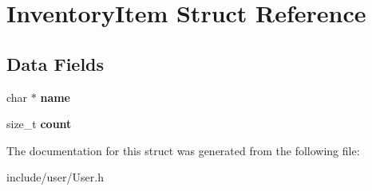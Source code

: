 \hypertarget{struct_inventory_item}{}\section{Inventory\+Item Struct Reference}
\label{struct_inventory_item}
\subsection*{Data Fields}
\begin{DoxyCompactItemize}
\item 
\hypertarget{struct_inventory_item_a5ac083a645d964373f022d03df4849c8}{}\label{struct_inventory_item_a5ac083a645d964373f022d03df4849c8} 
char $\ast$ {\bfseries name}
\item 
\hypertarget{struct_inventory_item_a76d971a3c552bc58ba9f0d5fceae9806}{}\label{struct_inventory_item_a76d971a3c552bc58ba9f0d5fceae9806} 
size\+\_\+t {\bfseries count}
\end{DoxyCompactItemize}


The documentation for this struct was generated from the following file\+:\begin{DoxyCompactItemize}
\item 
include/user/User.\+h\end{DoxyCompactItemize}
